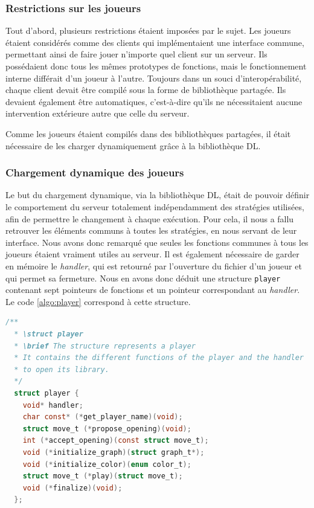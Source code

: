 \documentclass[a4paper, 12pt]{article}
\begin{document}
\subsubsection{Restrictions sur les joueurs}
Tout d'abord, plusieurs restrictions étaient imposées par le sujet. Les joueurs étaient considérés comme des clients qui implémentaient une interface commune, permettant ainsi de faire jouer n'importe quel client sur un serveur. Ils possédaient donc tous les mêmes prototypes de fonctions, mais le fonctionnement interne différait d'un joueur à l'autre. Toujours dans un souci d'interopérabilité, chaque client devait être compilé sous la forme de bibliothèque partagée. Ils devaient également être automatiques, c'est-à-dire qu'ils ne nécessitaient aucune intervention extérieure autre que celle du serveur.

Comme les joueurs étaient compilés dans des bibliothèques partagées, il était nécessaire de les charger dynamiquement grâce à la bibliothèque DL.

\subsubsection{Chargement dynamique des joueurs}
Le but du chargement dynamique, via la bibliothèque DL, était de pouvoir définir le comportement du serveur totalement indépendamment des stratégies utilisées, afin de permettre le changement à chaque exécution. Pour cela, il nous a fallu retrouver les éléments communs à toutes les stratégies, en nous servant de leur interface. Nous avons donc remarqué que seules les fonctions communes à tous les joueurs étaient vraiment utiles au serveur. Il est également nécessaire de garder en mémoire le \textit{handler}, qui est retourné par l'ouverture du fichier d'un joueur et qui permet sa fermeture. Nous en avons donc déduit une structure \texttt{player} contenant sept pointeurs de fonctions et un pointeur correspondant au \textit{handler}. Le code \ref{algo:player} correspond à cette structure.

\begin{lstlisting}[language=C, frame=single,columns=fullflexible, breaklines=true, label={algo:player}, mathescape, caption={Implémentation de la structure \texttt{player}.}, captionpos=b]
  /**
  * \struct player
  * \brief The structure represents a player
  * It contains the different functions of the player and the handler
  * to open its library.
  */
  struct player {
    void* handler;
    char const* (*get_player_name)(void);
    struct move_t (*propose_opening)(void);
    int (*accept_opening)(const struct move_t);
    void (*initialize_graph)(struct graph_t*);
    void (*initialize_color)(enum color_t);
    struct move_t (*play)(struct move_t);
    void (*finalize)(void);
  };
\end{lstlisting}
\end{document}
